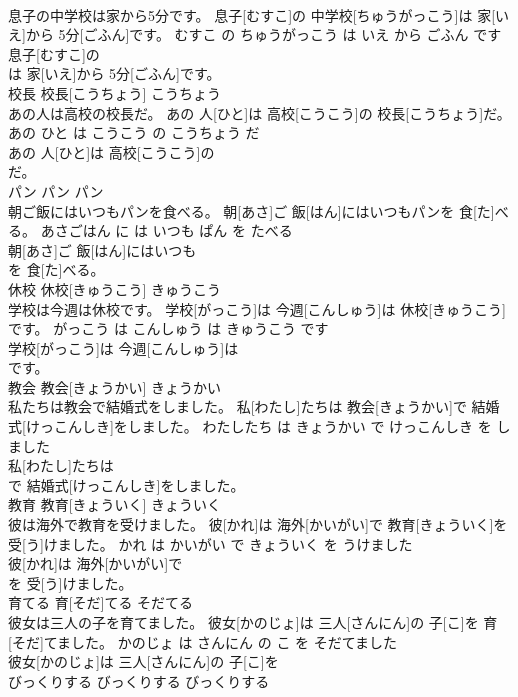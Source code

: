 \documentclass[8pt]{extreport}
\begin{document}
\begin{CJK}{UTF8}{min}
\\	息子の中学校は家から5分です。	息子[むすこ]の 中学校[ちゅうがっこう]は 家[いえ]から 5分[ごふん]です。	むすこ の ちゅうがっこう は いえ から ごふん です	
\\	息子[むすこ]の
\\	は 家[いえ]から 5分[ごふん]です。		
\\	校長	校長[こうちょう]	こうちょう	
\\	あの人は高校の校長だ。	あの 人[ひと]は 高校[こうこう]の 校長[こうちょう]だ。	あの ひと は こうこう の こうちょう だ	
\\	あの 人[ひと]は 高校[こうこう]の
\\	だ。		
\\	パン	パン	パン	
\\	朝ご飯にはいつもパンを食べる。	朝[あさ]ご 飯[はん]にはいつもパンを 食[た]べる。	あさごはん に は いつも ぱん を たべる	
\\	朝[あさ]ご 飯[はん]にはいつも
\\	を 食[た]べる。		
\\	休校	休校[きゅうこう]	きゅうこう	
\\	学校は今週は休校です。	学校[がっこう]は 今週[こんしゅう]は 休校[きゅうこう]です。	がっこう は こんしゅう は きゅうこう です	
\\	学校[がっこう]は 今週[こんしゅう]は
\\	です。		
\\	教会	教会[きょうかい]	きょうかい	
\\	私たちは教会で結婚式をしました。	私[わたし]たちは 教会[きょうかい]で 結婚式[けっこんしき]をしました。	わたしたち は きょうかい で けっこんしき を しました	
\\	私[わたし]たちは
\\	で 結婚式[けっこんしき]をしました。		
\\	教育	教育[きょういく]	きょういく	
\\	彼は海外で教育を受けました。	彼[かれ]は 海外[かいがい]で 教育[きょういく]を 受[う]けました。	かれ は かいがい で きょういく を うけました	
\\	彼[かれ]は 海外[かいがい]で
\\	を 受[う]けました。		
\\	育てる	育[そだ]てる	そだてる	
\\	彼女は三人の子を育てました。	彼女[かのじょ]は 三人[さんにん]の 子[こ]を 育[そだ]てました。	かのじょ は さんにん の こ を そだてました	
\\	彼女[かのじょ]は 三人[さんにん]の 子[こ]を
\\	びっくりする	びっくりする	びっくりする	

\end{CJK}
\end{document}
